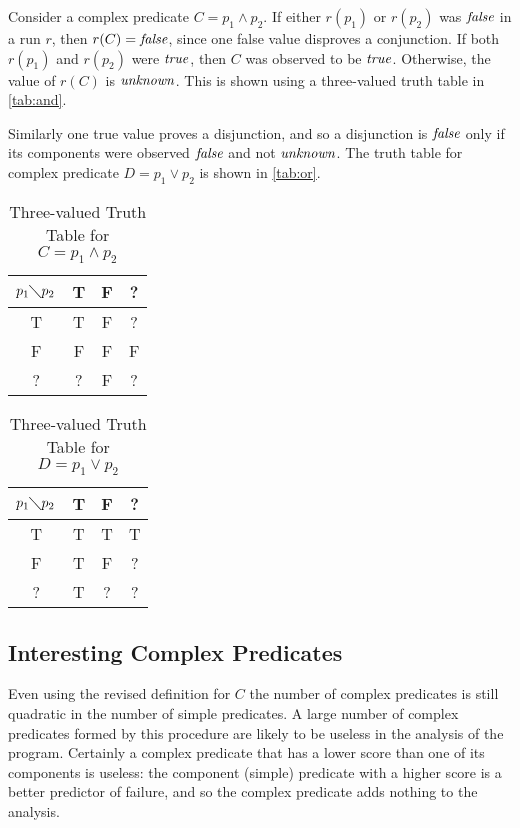 Consider a complex predicate $C = p_1 \wedge p_2$.  If either $r(p_1)$ or $r(p_2)$ was $\mathit{false}$ in a run $r$, then $r(C) = \mathit{false}$, since one false value disproves a conjunction.  If both $r(p_1)$ and $r(p_2)$ were $\mathit{true}$, then $C$ was observed to be $\mathit{true}$.  Otherwise, the value of $r(C)$ is $\mathit{unknown}$. This is shown using a three-valued truth table in \autoref{tab:and}.

Similarly one true value proves a disjunction, and so a disjunction is $\mathit{false}$ only if its components were observed $\mathit{false}$ and not $\mathit{unknown}$.  The truth table for complex predicate $D = p_1 \vee p_2$ is shown in \autoref{tab:or}.

\begin{table}
  \caption{Three-valued Truth Table for $C = p_1 \wedge p_2$}
  \label{tab:and}
  \centering
  \begin{tabular}{c|ccc}
    $p_1 \diagdown p_2$ & T & F & ? \\
    \hline
    T & T & F & ? \\
    F & F & F & F \\
    ? & ? & F & ? \\
  \end{tabular}
\end{table}


\begin{table}
  \caption{Three-valued Truth Table for $D = p_1 \vee p_2$}
  \label{tab:or}
  \centering
  \begin{tabular}{c|ccc}
    $p_1 \diagdown p_2$ & T & F & ? \\
    \hline
    T & T & T & T \\
    F & T & F & ? \\
    ? & T & ? & ? \\
  \end{tabular}
\end{table}

\subsection{Interesting Complex Predicates}
Even using the revised definition for $C$ the number of complex predicates is still quadratic in the number of simple predicates.  A large number of complex predicates formed by this procedure are likely to be useless in the analysis of the program.  Certainly a complex predicate that has a lower score than one of its components is useless: the component (simple) predicate with a higher score is a better predictor of failure, and so the complex predicate adds nothing to the analysis.

